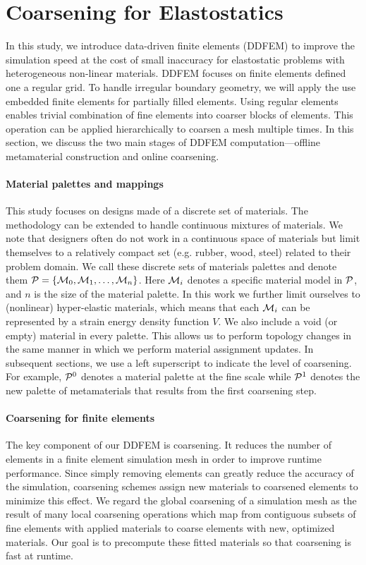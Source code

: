 \section{Coarsening for Elastostatics}
In this study, we introduce data-driven finite elements (DDFEM) to 
improve the simulation speed at the cost of small inaccuracy for elastostatic problems with heterogeneous non-linear materials. DDFEM focuses on finite elements defined one a regular grid.
To handle irregular boundary geometry, we will apply the use embedded finite elements for partially filled elements.
Using regular elements enables trivial combination of fine elements into coarser blocks of elements. This operation can be applied hierarchically to coarsen a mesh multiple times.
In this section, we discuss the two main stages of DDFEM computation---offline metamaterial construction and online coarsening.

\paragraph{Material palettes and mappings}
This study focuses on designs made of a discrete set of materials. The methodology can be extended to handle continuous mixtures of materials.
We note that designers often do not work in a continuous space of materials but limit themselves to a relatively compact set (e.g. rubber, wood, steel) related to their problem domain. We call these discrete sets of materials palettes and denote them $\mathcal{P}=\{\mathcal{M}_0, \mathcal{M}_1, \hdots, \mathcal{M}_n\}$. Here $\mathcal{M}_i$ denotes a specific material model in $\mathcal{P}$, and $n$ is the size of the material palette. In this work we further limit ourselves to (nonlinear) hyper-elastic materials, which means that each $\mathcal{M}_i$ can be represented by a strain energy density function $V$.
We also include a void (or empty) material in every palette. This allows us to perform topology changes in the same manner in which we perform material assignment updates.
In subsequent sections, we use a left superscript to indicate the level of coarsening. For example, $\mathcal{P}^0$ denotes a material palette at the fine scale while $\mathcal{P}^1$ denotes the new palette of metamaterials that results from the first coarsening step.

\paragraph{Coarsening for finite elements}
The key component of our DDFEM is coarsening. It reduces the number of elements in a finite element simulation mesh in order to improve runtime performance. Since simply removing elements can greatly reduce the accuracy of the simulation, coarsening schemes assign new materials to coarsened elements to minimize this effect.
We regard the global coarsening of a simulation mesh as the result of many local coarsening operations which map from contiguous subsets of fine elements with applied materials to coarse elements with new, optimized materials.
Our goal is to precompute these fitted materials so that coarsening is fast at runtime.

